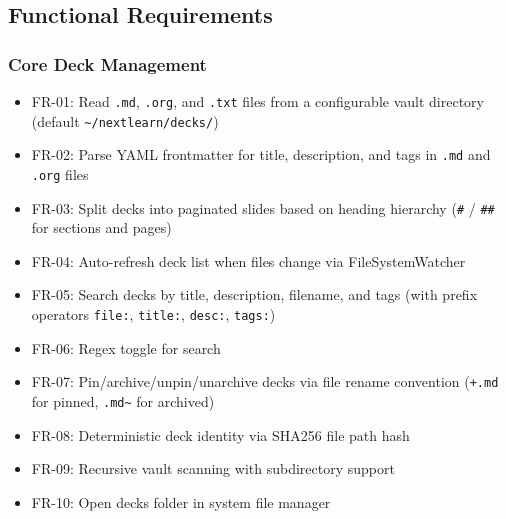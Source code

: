 \documentclass[14pt]{article}
\begin{document}
\newpage
\subsection{Functional Requirements}
\label{sec:org4e70ae5}
\subsubsection{Core Deck Management}
\label{sec:org0a5462d}
\begin{itemize}
\item FR-01: Read \texttt{.md}, \texttt{.org}, and \texttt{.txt} files from a configurable vault
directory (default \texttt{\textasciitilde{}/nextlearn/decks/})
\item FR-02: Parse YAML frontmatter for title, description, and tags in
\texttt{.md} and \texttt{.org} files
\item FR-03: Split decks into paginated slides based on heading hierarchy
(\texttt{\#} / \texttt{\#\#} for sections and pages)
\item FR-04: Auto-refresh deck list when files change via FileSystemWatcher
\item FR-05: Search decks by title, description, filename, and tags (with
prefix operators \texttt{file:}, \texttt{title:}, \texttt{desc:}, \texttt{tags:})
\item FR-06: Regex toggle for search
\item FR-07: Pin/archive/unpin/unarchive decks via file rename convention
(\texttt{+.md} for pinned, \texttt{.md\textasciitilde{}} for archived)
\item FR-08: Deterministic deck identity via SHA256 file path hash
\item FR-09: Recursive vault scanning with subdirectory support
\item FR-10: Open decks folder in system file manager
\end{itemize}
\end{document}
